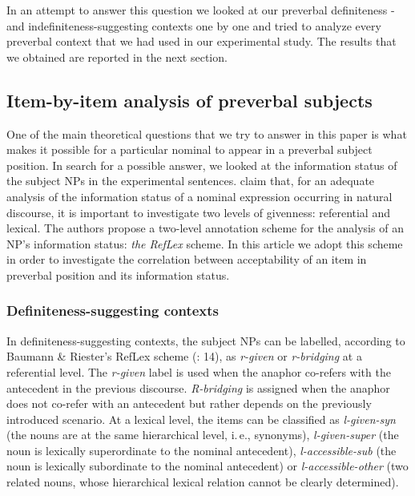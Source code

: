 \documentclass[output=paper]{langsci/langscibook}
\begin{document}
In an attempt to answer this question we looked at our preverbal definiteness \hspace*{-0.33em}- and indefiniteness-suggesting contexts one by one and tried to analyze every preverbal context that we had used in our experimental study. The results that we obtained are reported in the next section.

\subsection{Item-by-item analysis of preverbal subjects}\label{2sec:34}

One of the main theoretical questions that we try to answer in this paper is what makes it possible for a particular nominal to appear in a preverbal subject position. In search for a possible answer, we looked at the information status of the subject NPs in the experimental sentences. \cite{baumann:riester:12} claim that, for an adequate analysis of the information status of a nominal expression occurring in natural discourse, it is important to investigate two levels of givenness: referential and lexical. The authors propose a two-level annotation scheme for the analysis of an NP's information status: {\emph{the RefLex}} scheme. In this article we adopt this scheme in order to investigate the correlation between acceptability of an item in preverbal position and its information status.

\subsubsection{Definiteness-suggesting contexts}\label{2sec:341}
\largerpage[2]
In definiteness-suggesting contexts, the subject NPs can be labelled, according to Baumann \& Riester's RefLex scheme (\citeyear{baumann:riester:12}: 14), as {\emph{r-given}} or {\emph{r-bridging}} at a referential level. The {\emph{r-given}} label is used when the anaphor co-refers with the antecedent in the previous discourse. {\emph{R-bridging}} is assigned when the anaphor does not co-refer with an antecedent but rather depends on the previously introduced scenario. At a lexical level, the items can be classified \citep[][18-19]{baumann:riester:12} as {\emph{l-given-syn}} (the nouns are at the same hierarchical level, i.\,e., synonyms), {\emph{l-given-super}} (the noun is lexically superordinate to the nominal antecedent), {\emph{l-accessible-sub}} (the noun is lexically subordinate to the nominal antecedent) or {\emph{l-accessible-other}} (two related nouns, whose hierarchical lexical relation cannot be clearly determined).
\end{document}
